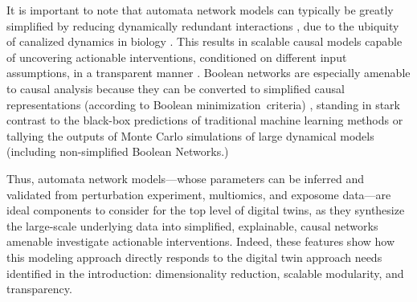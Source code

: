 \documentclass[12pt]{article}
\renewcommand{\(}{\left(}
\renewcommand{\)}{\right)}
\renewcommand{\[}{\left[}
\renewcommand{\]}{\right]}
\begin{document}
%

It is important to note that automata network models can typically be greatly simplified by reducing dynamically redundant interactions \cite{marques2013canalization}, due to the ubiquity of canalized dynamics in biology \cite{manicka2022effective,costa2023effective}. 
%
This results in scalable causal models capable of uncovering actionable interventions, conditioned on different input assumptions, in a transparent manner \cite{marques2013canalization,gates2021effective,rocha2022feasibility}.
%
Boolean networks are especially amenable to causal analysis
%
because they can be converted to simplified causal representations  (according to Boolean minimization criteria) \cite{marques2013canalization,gates2021effective,rozumPystablemotifsPythonLibrary2022,benesAEONPyPython2022}, 
%
standing in stark contrast to the black-box predictions of traditional machine learning methods or tallying the outputs of Monte Carlo simulations of large dynamical models (including non-simplified Boolean Networks.)
%


Thus, automata network models---whose parameters can be inferred and validated from perturbation experiment, multiomics, and exposome data---are ideal components to consider for the top level of digital twins, as they synthesize the large-scale underlying data into simplified, explainable, causal networks amenable investigate actionable interventions.
%
Indeed, these features show how this modeling approach directly responds to the digital twin approach needs identified in the introduction: dimensionality reduction, scalable modularity, and transparency.
\end{document}
